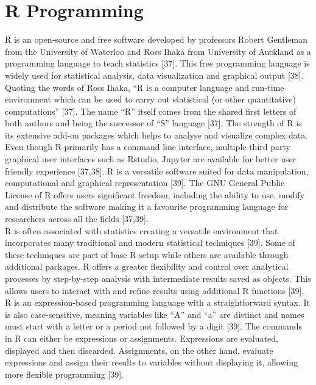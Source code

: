 \documentclass[12pt,a4paper]{report}
\begin{document}
\section{R Programming}
R is an open-source and free software developed by professors Robert Gentleman from the University of Waterloo and Ross Ihaka from University of Auckland as a programming language to teach statistics [37]. This free programming language 
is widely used for statistical analysis, data visualization and graphical output [38]. Quoting the words of Ross Ihaka, “R is a computer language and run-time environment which can be used to carry out statistical (or other quantitative) computations” [37]. 
The name “R” itself comes from the shared first letters of both authors and being the successor of “S” language [37]. The strength of R is its extensive add-on packages which helps to analyse and visualize complex data. Even though R primarily has a command 
line interface, multiple third party graphical user interfaces such as Rstudio, Jupyter are available for better user friendly experience [37,38]. R is a versatile software suited for data manipulation, computational and graphical representation [39]. The GNU General 
Public License of R offers users significant freedom, including the ability to use, modify and distribute the software making it a favourite programming language for researchers across all the fields [37,39]. \\

R is often associated with statistics creating a versatile environment that incorporates many traditional and modern statistical techniques [39]. Some of these techniques are part of base R setup while others are available through additional packages. R offers a greater flexibility and control over analytical 
processes by step-by-step analysis with intermediate results saved as objects. This allows users to interact with and refine results using additional R functions [39].
R is an expression-based programming language with a straightforward syntax. It is also case-sensitive, meaning variables like “A” and “a” are distinct and names must start with a letter or a period not followed by a digit [39]. The commands in R can either be expressions or assignments. 
Expressions are evaluated, displayed and then discarded. Assignments, on the other hand, evaluate expressions and assign their results to variables without displaying it, allowing more flexible programming [39]. \\
\end{document}
